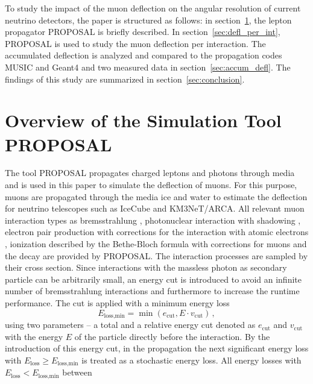 \documentclass[pdflatex, sn-mathphys]{sn-jnl}%
\theoremstyle{thmstyleone}%
\theoremstyle{thmstyletwo}%
\theoremstyle{thmstylethree}%
\begin{document}
To study the impact of the muon deflection on the angular resolution 
of current neutrino detectors, 
the paper is structured as follows: in section~\ref{sec:proposal},
the lepton propagator PROPOSAL is briefly described. In section~\ref{sec:defl_per_int},
PROPOSAL is used to study the muon deflection per interaction.
The accumulated deflection is analyzed and compared to the propagation codes
MUSIC and Geant4 and two measured data in section~\ref{sec:accum_defl}. The findings of this study
are summarized in section~\ref{sec:conclusion}.

\section{Overview of the Simulation Tool PROPOSAL}\label{sec:proposal}

The tool PROPOSAL \cite{koehne2013proposal, dunsch_2018_proposal_improvements} propagates charged leptons and photons through media and is 
used in this paper to simulate the deflection of muons. For this purpose, 
muons are propagated through the media ice and water 
to estimate the deflection for neutrino telescopes such as IceCube and KM3NeT/ARCA. All relevant muon interaction types 
as bremsstrahlung \cite{KKP_1995, Bremsstrahlung_KKP}, photonuclear interaction \cite{Abramowicz_1997} with 
shadowing \cite{ButkevichMikheyev_2002}, electron pair production \cite{epair_kokoulin_petrukhin} with corrections for the 
interaction with atomic electrons \cite{epair_kelner}, 
ionization described by the Bethe-Bloch formula with corrections for muons \cite{Rossi} 
and the decay are provided by PROPOSAL. The interaction processes are sampled by their cross section.
Since interactions 
with the massless photon as secondary particle can be arbitrarily small, an energy cut is introduced to avoid an infinite number of bremsstrahlung interactions 
and furthermore to increase the runtime performance. 
The cut is applied with a minimum energy loss
\begin{equation}
    E_{\text{loss,min}} = \min{(e_{\mathrm{cut}}, E \cdot v_{\mathrm{cut}})}\,,
\end{equation}
using two parameters -- a total and a relative energy cut denoted as 
$e_{\mathrm{cut}}$ and $v_{\mathrm{cut}}$ with the energy $E$ of the particle 
directly before the interaction. 
By the introduction of 
this energy cut, in the propagation the next significant energy loss with 
$E_{\mathrm{loss}} \geq E_{\text{loss,min}}$ 
is treated as a stochastic energy loss. 
All energy losses with $E_{\mathrm{loss}} < E_{\text{loss,min}}$ between 
\end{document}
